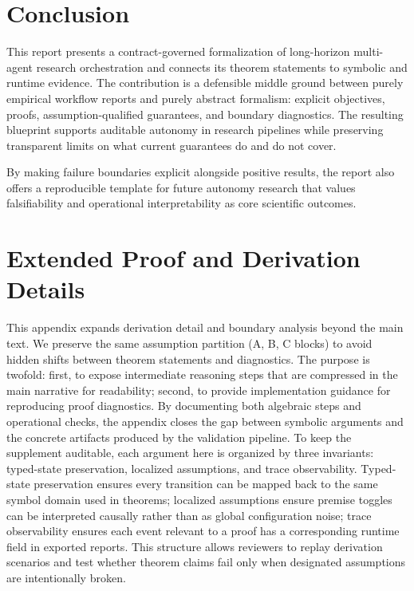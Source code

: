 \documentclass{article} %
\begin{document}
\section{Conclusion}
\label{sec:conclusion}
This report presents a contract-governed formalization of long-horizon multi-agent research orchestration and connects its theorem statements to symbolic and runtime evidence. The contribution is a defensible middle ground between purely empirical workflow reports and purely abstract formalism: explicit objectives, proofs, assumption-qualified guarantees, and boundary diagnostics. The resulting blueprint supports auditable autonomy in research pipelines while preserving transparent limits on what current guarantees do and do not cover.

By making failure boundaries explicit alongside positive results, the report also offers a reproducible template for future autonomy research that values falsifiability and operational interpretability as core scientific outcomes.

\clearpage{}\label{sec:end_of_main}
\label{sec:bibliography_start}


\nocite{*}



\appendix
\clearpage{}\label{sec:appendix_start}

\section{Extended Proof and Derivation Details}
\label{app:proofs}
This appendix expands derivation detail and boundary analysis beyond the main text. We preserve the same assumption partition (A, B, C blocks) to avoid hidden shifts between theorem statements and diagnostics.
The purpose is twofold: first, to expose intermediate reasoning steps that are compressed in the main narrative for readability; second, to provide implementation guidance for reproducing proof diagnostics. By documenting both algebraic steps and operational checks, the appendix closes the gap between symbolic arguments and the concrete artifacts produced by the validation pipeline.
To keep the supplement auditable, each argument here is organized by three invariants: typed-state preservation, localized assumptions, and trace observability. Typed-state preservation ensures every transition can be mapped back to the same symbol domain used in theorems; localized assumptions ensure premise toggles can be interpreted causally rather than as global configuration noise; trace observability ensures each event relevant to a proof has a corresponding runtime field in exported reports. This structure allows reviewers to replay derivation scenarios and test whether theorem claims fail only when designated assumptions are intentionally broken.
\end{document}
